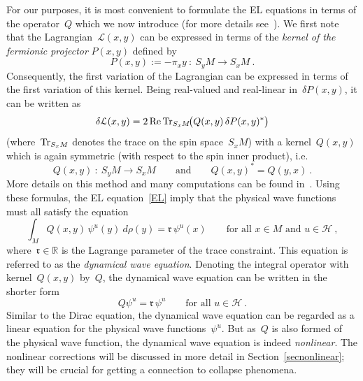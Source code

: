 \documentclass[reqno,11pt]{amsart}
\numberwithin{equation}{section}
\newcommand{\beq}{\begin{equation}}
\newcommand{\eeq}{\end{equation}}
\newcommand{\R}{\mathbb{R}}
\newcommand{\1}{\mathds{1}}
\renewcommand{\Tr}{\text{\rm{Tr}}}
\renewcommand{\L}{{\mathcal{L}}}
\renewcommand{\H}{\mathscr{H}}
\DeclareMathOperator{\re}{Re}
\begin{document}
For our purposes, it is most convenient to formulate the EL equations in terms of the operator~$Q$
which we now introduce (for more details see~\cite[Sections~2 and~3]{nonlocal}).
We first note that the Lagrangian~$\L(x,y)$ can be expressed in terms of the 
{\em{kernel of the fermionic projector}} $P(x,y)$ defined by
\[ %
P(x,y) := -\pi_x y \::\: S_yM \rightarrow S_xM \:. \]
Consequently, the first variation of the Lagrangian can be expressed in terms
of the first variation of this kernel. Being real-valued and real-linear in~$\delta P(x,y)$,
it can be written as
\[ %
\delta \L(x,y) = 2 \re \Tr_{S_xM} \!\big( Q(x,y)\, \delta P(x,y)^* \big) \]
(where~$\Tr_{S_xM}$ denotes the trace on the spin space~$S_xM$)
with a kernel~$Q(x,y)$ which is again symmetric (with respect to the spin inner product), i.e.
\beq \label{Qxydef}
Q(x,y) \::\: S_yM \rightarrow S_xM \qquad \text{and} \qquad Q(x,y)^* = Q(y,x) \:.
\eeq
More details on this method and many computations can be found in~\cite[Sections~1.4 and~2.6
as well as Chapters~3-5]{cfs}.
Using these formulas, the EL equation~\eqref{EL} imply that the physical wave functions
must all satisfy the equation
\[ \int_M Q(x,y)\, \psi^u(y) \:d\rho(y) = \mathfrak{r}\, \psi^u(x) \qquad \text{for all~$x \in M$ and~$u \in \H$}\:, \]
where~$\mathfrak{r} \in \R$ is the Lagrange parameter of the trace constraint.
This equation is referred to as the {\em{dynamical wave equation}}.
Denoting the integral operator with kernel~$Q(x,y)$ by~$Q$, the dynamical wave equation
can be written in the shorter form
\beq \label{ELQ}
Q \psi^u = \mathfrak{r}\, \psi^u \qquad \text{for all~$u \in \H$}\:.
\eeq
Similar to the Dirac equation, the dynamical wave equation can be regarded as a linear equation
for the physical wave functions~$\psi^u$. But as~$Q$ is also formed of the physical wave function,
the dynamical wave equation is indeed {\em{nonlinear}}. The nonlinear corrections will be discussed in
more detail in Section~\ref{secnonlinear}; they will be crucial for getting a connection to collapse phenomena.
\end{document}
